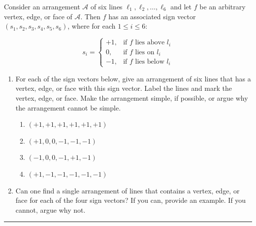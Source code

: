 \documentclass[11pt]{article}
\newcommand{\A}{{\mathcal{A}}}
\begin{document}

Consider an arrangement $\A$ of six lines $\ell_1, \ell_2, \ldots, \ell_6$ and
let $f$ be an arbitrary vertex, edge, or face of $\A$. Then $f$ has an
associated sign vector $(s_1, s_2, s_3, s_4, s_5, s_6)$, where for each $1 \le i
\le 6$:

$$
    s_i =
    \begin{cases}
        +1, & \text{if $f$ lies above $l_i$} \\
        0,  & \text{if $f$ lies on $l_i$} \\
        -1, & \text{if $f$ lies below $l_i$}
    \end{cases}
$$

\begin{enumerate}

    \item For each of the sign vectors below, give an arrangement of six lines
        that has a vertex, edge, or face with this sign vector. Label the lines
        and mark the vertex, edge, or face. Make the arrangement simple, if
        possible, or argue why the arrangement cannot be simple.
        \begin{enumerate}
            \item $(+1, +1, +1, +1, +1, +1)$
            \item $(+1, 0, 0, -1, -1, -1)$
            \item $(-1, 0, 0, -1, +1, -1)$
            \item $(+1, -1, -1, -1, -1, -1)$
        \end{enumerate}

    \item Can one find a single arrangement of lines that contains a vertex,
        edge, or face for each of the four sign vectors? If you can, provide an
        example.  If you cannot, argue why not.

\end{enumerate}

\hrule
\end{document}
